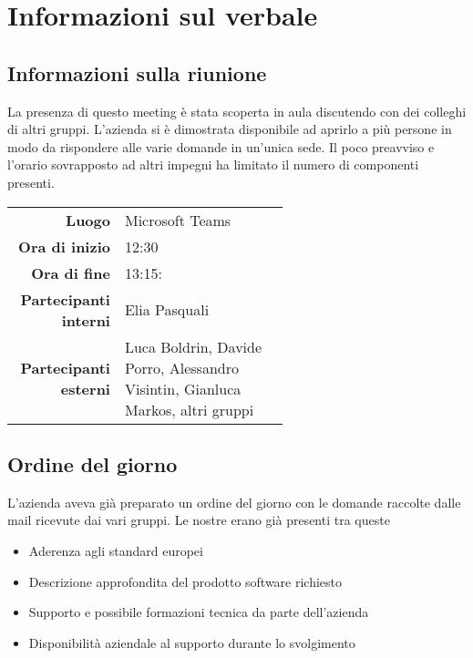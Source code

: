 \section{Informazioni sul verbale}

\subsection{Informazioni sulla riunione}
La presenza di questo meeting è stata scoperta in aula discutendo con dei colleghi di altri gruppi. L'azienda si è dimostrata disponibile ad aprirlo a più persone in modo da rispondere alle varie domande in un'unica sede. Il poco preavviso e l'orario sovrapposto ad altri impegni ha limitato il numero di componenti presenti. 

\begin{center}
	\begin{tabular}{r|p{0.6\linewidth}}
		\toprule
		\textbf{Luogo} & Microsoft Teams \\
		\textbf{Ora di inizio} & 12:30 \\
		\textbf{Ora di fine} & 13:15: \\
		\textbf{Partecipanti interni} & Elia Pasquali \\
		\textbf{Partecipanti esterni} & Luca Boldrin, Davide Porro, Alessandro Visintin, Gianluca Markos, altri gruppi
	\end{tabular}
\end{center}

\medskip

\subsection{Ordine del giorno}
L'azienda aveva già preparato un ordine del giorno con le domande raccolte dalle mail ricevute dai vari gruppi. Le nostre erano già presenti tra queste
\begin{itemize}
	\item Aderenza agli standard europei
	\item Descrizione approfondita del prodotto software richiesto
	\item Supporto e possibile formazioni tecnica da parte dell'azienda
	\item Disponibilità aziendale al supporto durante lo svolgimento
\end{itemize}
